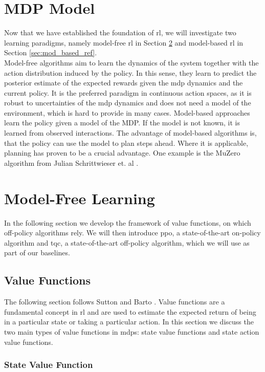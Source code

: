 \section{MDP Model}
Now that we have established the foundation of \ac{rl}, we will investigate two learning paradigms, 
namely model-free \ac{rl} in Section \ref{sec:mod_free_ref} and model-based 
\ac{rl} in Section \ref{sec:mod_based_ref}. \\

Model-free algorithms aim to learn the dynamics of the system together with the action distribution induced by the policy. In this sense, they learn to predict the posterior 
estimate of the expected rewards given the \ac{mdp} dynamics and the current policy. It is the preferred paradigm in continuous action spaces, 
as it is robust to uncertainties of the \ac{mdp} dynamics and does not need a model of the environment, which is hard to provide in many cases. 
Model-based approaches learn the policy given a model of the MDP. If the model is not known, it is learned 
from observed interactions. The advantage of model-based algorithms is, that the policy can use the model to plan steps ahead. 
Where it is applicable, planning has proven to be 
a crucial advantage. One example is the MuZero algorithm from Julian Schrittwieser et. al \cite{MUZero}.

\section{Model-Free Learning}
\label{sec:mod_free_ref}
In the following section we develop the framework of value functions, on which off-policy algorithms rely. 
We will then introduce \ac{ppo}, a state-of-the-art on-policy algorithm and \ac{tqc}, a state-of-the-art off-policy algorithm, 
which we will use as part of our baselines.

\subsection{Value Functions}

The following section follows Sutton and Barto \cite{sutton2015reinforcement}. Value functions are a fundamental concept in \ac{rl} and are used to estimate the expected return of being in a 
particular state or taking a particular action. In this section we discuss the two main types of value functions in \ac{mdp}s: state 
value functions and state action value functions.

\subsubsection{State Value Function}

